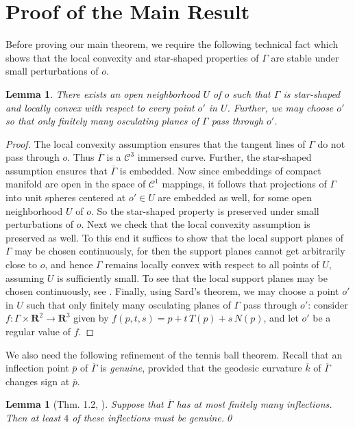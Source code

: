 \documentclass[11pt]{amsart}
\newtheorem{lem}[thm]{Lemma}
\theoremstyle{definition}
\newcommand{\R}{\mathbf{R}}
\newcommand{\ol}{\overline}
\newcommand{\C}{\mathcal{C}}
\renewcommand{\(}{\left(}
\renewcommand{\)}{\right)}
\begin{document}
\section{Proof of the Main Result}

Before proving our main theorem, we require the following technical fact which shows that the local convexity and star-shaped  properties of $\Gamma$ are stable under small perturbations of $o$.

\begin{lem}\label{lem:oprime}
There exists an open neighborhood $U$ of $o$ such that $\Gamma$ is star-shaped and locally convex with respect to every point $o'$ in $U$.
Further, we may choose $o'$ so that only finitely many osculating planes of $\Gamma$ pass through $o'$.
 \end{lem}
\begin{proof}
The local convexity assumption ensures that the tangent lines of $\Gamma$ do not pass through $o$. Thus $\ol\Gamma$ is a $\C^3$ immersed curve. Further, the star-shaped assumption ensures that $\ol\Gamma$ is embedded. Now since embeddings of compact manifold are open in the space of $\C^1$ mappings, it follows that projections of $\Gamma$ into unit spheres centered at $o'\in U$ are embedded  as well, for some open neighborhood $U$ of $o$. So the star-shaped property is preserved under small perturbations of $o$. Next we  check that the local convexity assumption is preserved as well. To this end it suffices to show that the local support planes of $\Gamma$ may be chosen continuously, for then the support planes cannot get arbitrarily close to $o$, and hence $\Gamma$ remains locally convex with respect to all points of $U$, assuming $U$ is sufficiently small. To see that the local support planes may be chosen continuously, see \cite[Sec 3.1]{ghomi:stconvex}.
Finally, using Sard's theorem, we may choose a point $o'$ in $U$ such that only finitely many osculating planes of $\Gamma$ pass through $o'$: consider  $f\colon\Gamma\times\R^2\to\R^3$ given by $f(p, t, s)= p+t\, T(p) +s\, N(p)$, and let $o'$ be a regular value of $f$. 
\end{proof}

We also need the following refinement of the tennis ball theorem. Recall that an inflection point $\ol p$ of $\ol\Gamma$ is \emph{genuine}, provided that the geodesic curvature $\ol k$ of $\ol\Gamma$ changes sign at $\ol p$.

\begin{lem}[Thm. 1.2, \cite{ghomi:verticesC}]\label{lem:tennisball}
Suppose that $\ol\Gamma$ has at most  finitely many inflections. Then at least $4$ of these inflections must be genuine.\qed
\end{lem}
 
\end{document}
